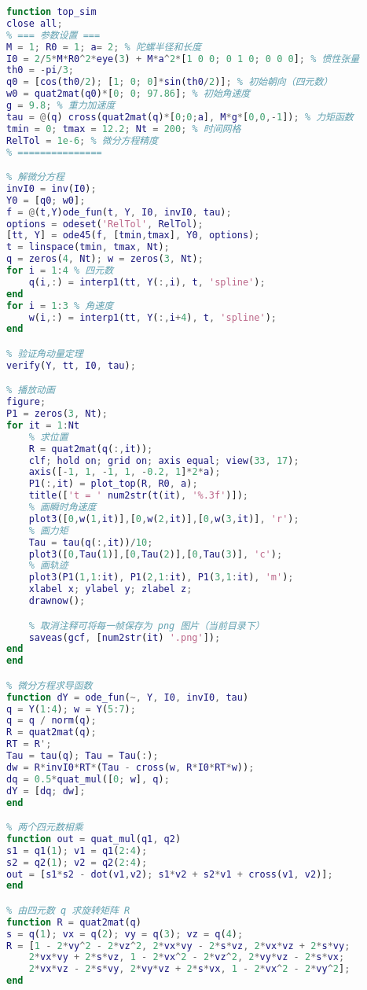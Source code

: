 
\begin{lstlisting}[language=matlab, caption=top\_sim.m]
% 陀螺的数值计算
function top_sim
close all;
% === 参数设置 ===
M = 1; R0 = 1; a= 2; % 陀螺半径和长度
I0 = 2/5*M*R0^2*eye(3) + M*a^2*[1 0 0; 0 1 0; 0 0 0]; % 惯性张量
th0 = -pi/3;
q0 = [cos(th0/2); [1; 0; 0]*sin(th0/2)]; % 初始朝向（四元数）
w0 = quat2mat(q0)*[0; 0; 97.86]; % 初始角速度
g = 9.8; % 重力加速度
tau = @(q) cross(quat2mat(q)*[0;0;a], M*g*[0,0,-1]); % 力矩函数
tmin = 0; tmax = 12.2; Nt = 200; % 时间网格
RelTol = 1e-6; % 微分方程精度
% ===============

% 解微分方程
invI0 = inv(I0);
Y0 = [q0; w0];
f = @(t,Y)ode_fun(t, Y, I0, invI0, tau);
options = odeset('RelTol', RelTol);
[tt, Y] = ode45(f, [tmin,tmax], Y0, options);
t = linspace(tmin, tmax, Nt);
q = zeros(4, Nt); w = zeros(3, Nt);
for i = 1:4 % 四元数
    q(i,:) = interp1(tt, Y(:,i), t, 'spline');
end
for i = 1:3 % 角速度
    w(i,:) = interp1(tt, Y(:,i+4), t, 'spline');
end

% 验证角动量定理
verify(Y, tt, I0, tau);

% 播放动画
figure;
P1 = zeros(3, Nt);
for it = 1:Nt
    % 求位置
    R = quat2mat(q(:,it));
    clf; hold on; grid on; axis equal; view(33, 17);
    axis([-1, 1, -1, 1, -0.2, 1]*2*a);
    P1(:,it) = plot_top(R, R0, a);
    title(['t = ' num2str(t(it), '%.3f')]);
    % 画瞬时角速度
    plot3([0,w(1,it)],[0,w(2,it)],[0,w(3,it)], 'r');
    % 画力矩
    Tau = tau(q(:,it))/10;
    plot3([0,Tau(1)],[0,Tau(2)],[0,Tau(3)], 'c');
    % 画轨迹
    plot3(P1(1,1:it), P1(2,1:it), P1(3,1:it), 'm');
    xlabel x; ylabel y; zlabel z;
    drawnow();

    % 取消注释可将每一帧保存为 png 图片（当前目录下）
    saveas(gcf, [num2str(it) '.png']);
end
end

% 微分方程求导函数
function dY = ode_fun(~, Y, I0, invI0, tau)
q = Y(1:4); w = Y(5:7);
q = q / norm(q);
R = quat2mat(q);
RT = R';
Tau = tau(q); Tau = Tau(:);
dw = R*invI0*RT*(Tau - cross(w, R*I0*RT*w));
dq = 0.5*quat_mul([0; w], q);
dY = [dq; dw];
end

% 两个四元数相乘
function out = quat_mul(q1, q2)
s1 = q1(1); v1 = q1(2:4);
s2 = q2(1); v2 = q2(2:4);
out = [s1*s2 - dot(v1,v2); s1*v2 + s2*v1 + cross(v1, v2)];
end

% 由四元数 q 求旋转矩阵 R
function R = quat2mat(q)
s = q(1); vx = q(2); vy = q(3); vz = q(4);
R = [1 - 2*vy^2 - 2*vz^2, 2*vx*vy - 2*s*vz, 2*vx*vz + 2*s*vy;
    2*vx*vy + 2*s*vz, 1 - 2*vx^2 - 2*vz^2, 2*vy*vz - 2*s*vx;
    2*vx*vz - 2*s*vy, 2*vy*vz + 2*s*vx, 1 - 2*vx^2 - 2*vy^2];
end


\end{lstlisting}
